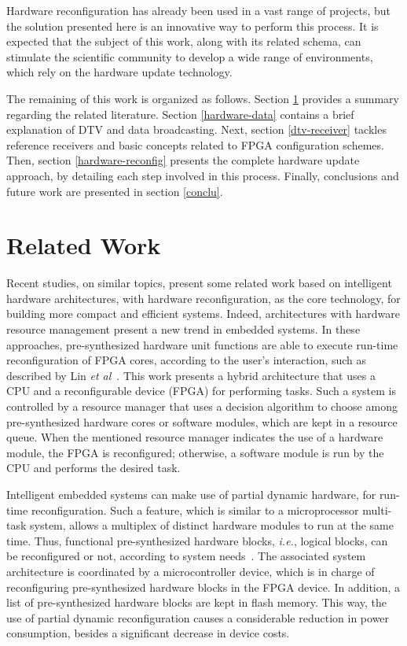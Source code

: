Hardware reconfiguration has already been used in a vast range of projects, but the solution presented here is an innovative way to perform this process. It is expected that the subject of this work, along with its related schema, can stimulate the scientific community to develop a wide range of environments, which rely on the hardware update technology.

The remaining of this work is organized as follows. Section \ref{related-work} provides a summary regarding the related literature. Section \ref{hardware-data} contains a brief explanation of DTV and data broadcasting. Next, section \ref{dtv-receiver} tackles reference receivers and basic concepts related to FPGA configuration schemes. Then, section \ref{hardware-reconfig} presents the complete hardware update approach, by detailing each step involved in this process. Finally, conclusions and future work are presented in section \ref{conclu}.


\section{Related Work}
\label{related-work}

Recent studies, on similar topics, present some related work based on intelligent hardware architectures, with hardware reconfiguration, as the core technology, for building more compact and efficient systems.
Indeed, architectures with hardware resource management present a new trend in embedded systems. In these approaches, pre-synthesized hardware unit functions are able to execute run-time reconfiguration of FPGA cores, according to the user's interaction, such as described by Lin {\em et al}~\cite{ref13}.  
This work presents a hybrid architecture that uses a CPU and a reconfigurable device (FPGA) for performing tasks. Such a system is controlled by a resource manager that uses a decision algorithm to choose among pre-synthesized hardware cores or software modules, which are kept in a resource queue. When the mentioned resource manager indicates the use of a hardware module, the FPGA is reconfigured; otherwise, a software module is run by the CPU and performs the desired task.

Intelligent embedded systems can make use of partial dynamic hardware, for run-time reconfiguration. Such a feature, which is similar to a microprocessor multi-task system, allows a multiplex of distinct hardware modules to run at the same time. Thus, functional pre-synthesized hardware blocks, {\em i.e.}, logical blocks, can be reconfigured or not, according to system needs~\cite{ref14}. The associated system architecture is coordinated by a microcontroller device, which is in charge of reconfiguring pre-synthesized hardware blocks in the FPGA device. In addition, a list of pre-synthesized hardware blocks are kept in flash memory. This way, the use of partial dynamic reconfiguration causes a considerable reduction in power consumption, besides a significant decrease in device costs.


